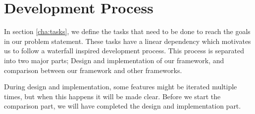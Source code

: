 \section{Development Process}
In section \ref{cha:tasks}, we define the tasks that need to be done to reach the goals in our problem statement. These tasks have a linear dependency which motivates us to follow a waterfall inspired development process. This process is separated into two major parts; Design and implementation of our framework, and comparison between our framework and other frameworks. 

During design and implementation, some features might be iterated multiple times, but when this happens it will be made clear. Before we start the comparison part, we will have completed the design and implementation part.

